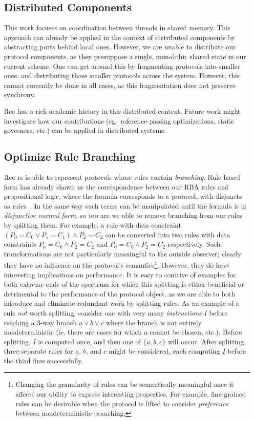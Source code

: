 \subsection{Distributed Components}
This work focuses on coordination between threads in shared memory. This approach can already be applied in the context of distributed components by abstracting ports behind local ones. However, we are unable to distribute our protocol components, as they presuppose a single, monolithic shared state in our current scheme. One can get around this by fragmenting protocols into smaller ones, and distributing those smaller protocols across the system. However, this cannot currently be done in all cases, as this fragmentation does not preserve synchrony. 

Reo has a rich academic history in this distributed context. Future work might investigate how our contributions (eg.\ reference-passing optimizations, static governors, etc.) can be applied in distributed systems.


\subsection{Optimize Rule Branching}
\label{sec:future_branches}
Reo-rs is able to represent protocols whose rules contain \textit{branching}. Rule-based form has already shown us the correspondence between our RBA rules and propositional logic, where the formula corresponds to a protocol, with disjuncts as rules~\cite{dokter2018rule}. In the same way such terms can be manipulated until the formula is in \textit{disjunctive normal form}, so too are we able to remove branching from our rules by splitting them. For example, a rule with data constraint $(P_0=C_0\vee{}P_1=C_1)\wedge{}P_2=C_2$ can be converted into two rules with data constraints $P_0=C_0\wedge{}P_2=C_2$ and $P_0=C_0\wedge{}P_2=C_2$ respectively. Such transformations are not particularly meaningful to the outside observer; clearly they have  no influence on the protocol's semantics\footnote{Changing the granularity of rules can be semantically meaningful once it affects our ability to express interesting properties. For example, fine-grained rules can be desirable when the protocol is lifted to consider \textit{preference} between nondeterministic branching.}. However, they do have interesting implications on performance. It is easy to contrive of examples for both extreme ends of the spectrum for which this splitting is either beneficial or detrimental to the performance of the protocol object, as we are able to both introduce and eliminate redundant work by splitting rules. As an example of a rule \textit{not} worth splitting, consider one with very many \textit{instructions} $I$ before reaching a 3-way branch $a\vee{}b\vee{}c$ where the branch is not entirely nondeterministic (ie. there are cases for which $a$ cannot be chosen, etc.). Before splitting, $I$ is computed once, and then one of $\{a,b,c\}$ will occur. After splitting, three separate rules for $a$, $b$, and $c$ might be considered, each computing $I$ before the third fires successfully.


